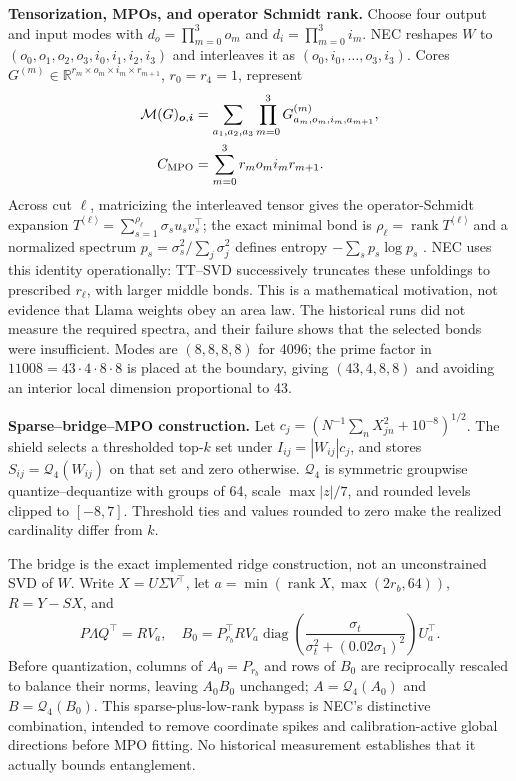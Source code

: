 \documentclass[10pt,twocolumn]{article}
\newcommand{\R}{\mathbb{R}}
\newcommand{\Q}{\mathcal{Q}_4}
\newcommand{\M}{\mathcal{M}}
\begin{document}
\textbf{Tensorization, MPOs, and operator Schmidt rank.}
Choose four output and input modes with $d_o=\prod_{m=0}^3o_m$ and $d_i=\prod_{m=0}^3i_m$.  NEC reshapes $W$ to $(o_0,o_1,o_2,o_3,i_0,i_1,i_2,i_3)$ and interleaves it as $(o_0,i_0,\ldots,o_3,i_3)$.  Cores $G^{(m)}\in\R^{r_m\times o_m\times i_m\times r_{m+1}}$, $r_0=r_4=1$, represent
\begin{equation}
\begin{aligned}
 \M(G)_{\boldsymbol o,\boldsymbol i}
 &=\sum_{a_1,a_2,a_3}\prod_{m=0}^3
 G^{(m)}_{a_m,o_m,i_m,a_{m+1}},\\
 C_{\rm MPO}&=\sum_{m=0}^3r_mo_mi_mr_{m+1}.
\end{aligned}                                                   \label{eq:mpo}
\end{equation}
Across cut $\ell$, matricizing the interleaved tensor gives the operator-Schmidt expansion $T^{\langle\ell\rangle}=\sum_{s=1}^{\rho_\ell}\sigma_s u_sv_s^\top$; the exact minimal bond is $\rho_\ell=\operatorname{rank}T^{\langle\ell\rangle}$ and a normalized spectrum $p_s=\sigma_s^2/\sum_j\sigma_j^2$ defines entropy $-\sum_sp_s\log p_s$ \cite{schmidt1907,oseledets2011}.  NEC uses this identity operationally: TT--SVD successively truncates these unfoldings to prescribed $r_\ell$, with larger middle bonds.  This is a mathematical motivation, not evidence that Llama weights obey an area law.  The historical runs did not measure the required spectra, and their failure shows that the selected bonds were insufficient.  Modes are $(8,8,8,8)$ for 4096; the prime factor in $11008=43\cdot4\cdot8\cdot8$ is placed at the boundary, giving $(43,4,8,8)$ and avoiding an interior local dimension proportional to 43.

\textbf{Sparse--bridge--MPO construction.}
Let $c_j=(N^{-1}\sum_nX_{jn}^2+10^{-8})^{1/2}$.  The shield selects a thresholded top-$k$ set under $I_{ij}=|W_{ij}|c_j$, and stores
$S_{ij}=\Q(W_{ij})$ on that set and zero otherwise.  $\Q$ is symmetric groupwise quantize--dequantize with groups of 64, scale $\max|z|/7$, and rounded levels clipped to $[-8,7]$.  Threshold ties and values rounded to zero make the realized cardinality differ from $k$.

The bridge is the exact implemented ridge construction, not an unconstrained SVD of $W$.  Write $X=U\Sigma V^\top$, let $a=\min(\operatorname{rank}X,\max(2r_b,64))$, $R=Y-SX$, and
\begin{equation}
 P\Lambda Q^\top=RV_a,\quad
 B_0=P_{r_b}^{\top}RV_a
 \operatorname{diag}\!\left(\frac{\sigma_t}{\sigma_t^2+(0.02\sigma_1)^2}\right)U_a^\top . \label{eq:bridge}
\end{equation}
Before quantization, columns of $A_0=P_{r_b}$ and rows of $B_0$ are reciprocally rescaled to balance their norms, leaving $A_0B_0$ unchanged; $A=\Q(A_0)$ and $B=\Q(B_0)$.  This sparse-plus-low-rank bypass is NEC's distinctive combination, intended to remove coordinate spikes and calibration-active global directions before MPO fitting.  No historical measurement establishes that it actually bounds entanglement.
\end{document}
